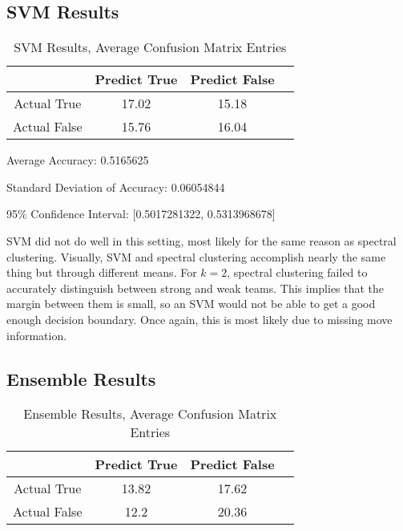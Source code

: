 \documentclass{acm_proc_article-sp}
\begin{document}
\subsection{SVM Results}

\begin{table}

\centering

\caption{SVM Results, Average Confusion Matrix Entries}

\begin{tabular}{|c|c|c|l|} \hline

 & Predict True & Predict False \\ \hline
Actual True & 17.02 & 15.18 \\ \hline
Actual False & 15.76 & 16.04 \\ \hline

\end{tabular}

\end{table}

Average Accuracy: 0.5165625

Standard Deviation of Accuracy: 0.06054844

95\% Confidence Interval: [0.5017281322, 0.5313968678]

SVM did not do well in this setting, most likely for the same reason as spectral clustering. Visually, SVM and spectral clustering accomplish nearly the same thing but through different means. For $k=2$, spectral clustering failed to accurately distinguish between strong and weak teams. This implies that the margin between them is small, so an SVM would not be able to get a good enough decision boundary. Once again, this is most likely due to missing move information.

\subsection{Ensemble Results}

\begin{table}

\centering

\caption{Ensemble Results, Average Confusion Matrix Entries}

\begin{tabular}{|c|c|c|l|} \hline

 & Predict True & Predict False \\ \hline
Actual True & 13.82 & 17.62 \\ \hline
Actual False & 12.2 & 20.36 \\ \hline

\end{tabular}

\end{table}
\end{document}
